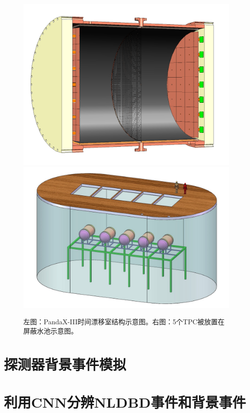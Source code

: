 \begin{figure}[tbp]
    \centering
    \includegraphics[width=0.4\columnwidth]{pic/fig1.png}
    \includegraphics[width=0.4\columnwidth]{pic/fig2.jpg}
    \caption{左图：PandaX-III时间漂移室结构示意图。右图：5个TPC被放置在屏蔽水池示意图。}
    \label{fig:detector}
\end{figure}
    
    
\chapter{探测器背景事件模拟}
\chapter{利用CNN分辨NLDBD事件和背景事件}
\label{section:3}
